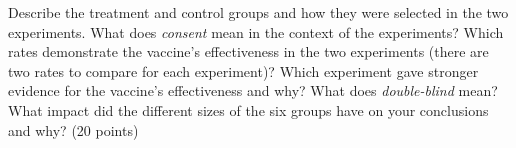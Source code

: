 \documentclass[10pt]{article}
\begin{document}
Describe the treatment and control groups and how they were selected 
in the two experiments.  
What does \textit{consent} mean in the context of the experiments?
Which rates demonstrate the vaccine's effectiveness in the two experiments 
(there are two rates to compare for each experiment)?  
Which experiment gave stronger evidence for the vaccine's effectiveness and why?
What does \textit{double-blind} mean?
What impact did the different sizes of the six groups have on your conclusions and why?
(20 points)


\vfill
\eject
\end{document}
